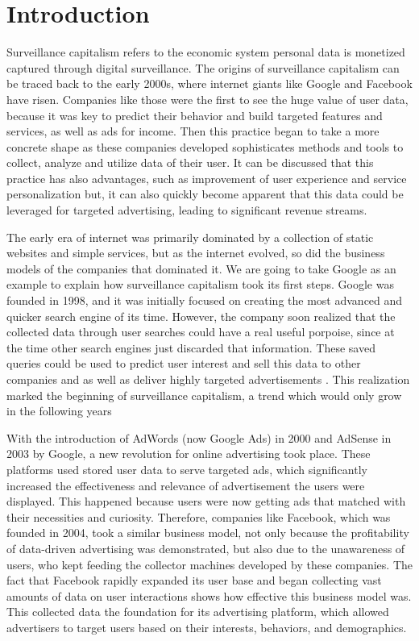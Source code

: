 \section{Introduction}\label{sec:introduction}
Surveillance capitalism refers to the economic system personal data is monetized captured through digital surveillance.
The origins of surveillance capitalism can be traced back to the early 2000s, where internet giants like Google and Facebook have risen.
Companies like those were the first to see the huge value of user data, because it was key to predict their behavior and build targeted features and services, as well as ads for income.
Then this practice began to take a more concrete shape as these companies developed sophisticates methods and tools to collect, analyze and utilize data of their user.
It can be discussed that this practice has also advantages, such as improvement of user experience and service personalization but, it can also quickly become apparent that this data could be leveraged for targeted advertising, leading to significant revenue streams.

The early era of internet was primarily dominated by a collection of static websites and simple services, but as the internet evolved, so did the business models of the companies that dominated it.
We are going to take Google as an example to explain how surveillance capitalism took its first steps.
Google was founded in 1998, and it was initially focused on creating the most advanced and quicker search engine of its time.
However, the company soon realized that the collected data through user searches could have a real useful porpoise, since at the time other search engines just discarded that information.
These saved queries could be used to predict user interest and sell this data to other companies and as well as deliver highly targeted advertisements .
This realization marked the beginning of surveillance capitalism, a trend which would only grow in the following years

With the introduction of AdWords (now Google Ads) in 2000 and AdSense in 2003 by Google, a new revolution for online advertising took place.
These platforms used stored user data to serve targeted ads, which significantly increased the effectiveness and relevance of advertisement the users were displayed.
This happened because users were now getting ads that matched with their necessities and curiosity.
Therefore, companies like Facebook, which was founded in 2004, took a similar business model, not only because the profitability of data-driven advertising was demonstrated, but also due to the unawareness of users, who kept feeding the collector machines developed by these companies.
The fact that Facebook rapidly expanded its user base and began collecting vast amounts of data on user interactions shows how effective this business model was.
This collected data the foundation for its advertising platform, which allowed advertisers to target users based on their interests, behaviors, and demographics.

